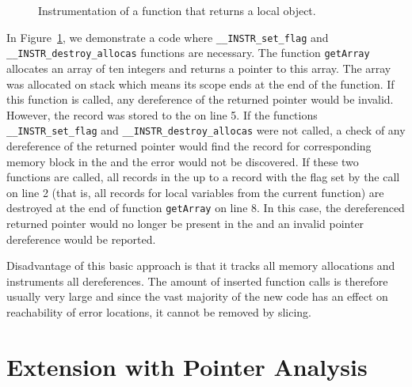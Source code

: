 \begin{figure}[t]

\caption{Instrumentation of a function that returns a local object.}
\label{fig:examplesetflags}
\end{figure}

In Figure~\ref{fig:examplesetflags}, we demonstrate a code where
\texttt{\_\_INSTR\_set\_flag} and \texttt{\_\_INSTR\_destroy\_allocas}
functions are necessary. The function \texttt{getArray} allocates an array of
ten integers and returns a pointer to this array. The array was allocated on
stack which means its scope ends at the end of the function. If this function
is called, any dereference of the returned pointer would be invalid. However,
the record was stored to the \stacklist on line 5. If the functions
\texttt{\_\_INSTR\_set\_flag} and \texttt{\_\_INSTR\_destroy\_allocas} were not
called, a check of any dereference of the returned pointer would find the
record for corresponding memory block in the \stacklist and the error would not
be discovered. If these two functions are called, all records in the \stacklist
up to a record with the flag set by the call on line 2 (that is, all records
for local variables from the current function) are destroyed at the end of
function \texttt{getArray} on line 8. In this case, the dereferenced
returned pointer would no longer be present in the \stacklist and an
invalid pointer dereference would be reported.

Disadvantage of this basic approach is that it tracks all memory allocations and
instruments all dereferences. The amount of inserted function calls is
therefore usually very large and since the vast majority of the new code has
an effect on reachability of error locations, it cannot be removed by slicing.

\section{Extension with Pointer Analysis}\label{sec:pta}

